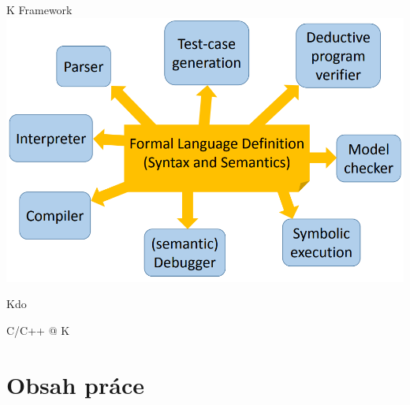 \documentclass[11pt]{beamer}
\begin{document}
\begin{frame}{K Framework}
\includegraphics[width=1.0\linewidth]{img/kidea.png}
\end{frame}

\begin{frame}{Kdo}

\end{frame}

\begin{frame}{C/C++ @ K}

\end{frame}

\section{Obsah práce}




\end{document}

